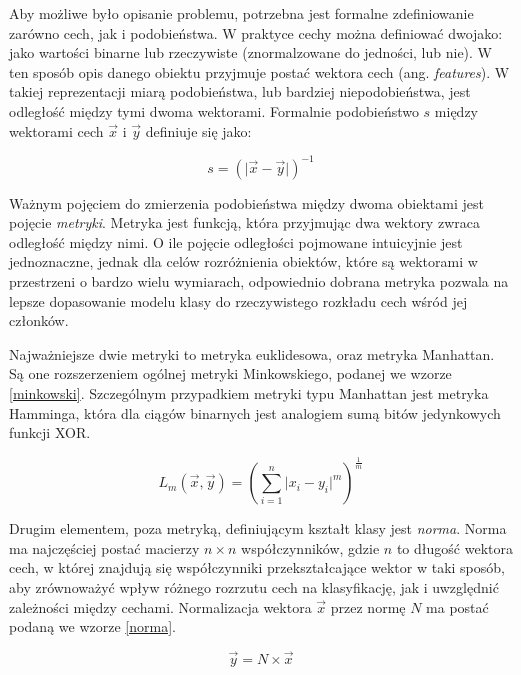 \documentclass[12pt,a4paper,oneside]{report} %
\begin{document}
Aby możliwe było opisanie problemu, potrzebna jest formalne zdefiniowanie zarówno cech, jak i podobieństwa. W praktyce cechy można definiować dwojako: jako wartości binarne lub rzeczywiste (znormalzowane do jedności, lub nie). W ten sposób opis danego obiektu przyjmuje postać wektora cech (ang. \emph{features}). W takiej reprezentacji miarą podobieństwa, lub bardziej niepodobieństwa, jest odległość między tymi dwoma wektorami. Formalnie podobieństwo $s$ między wektorami cech $\vec{x}$ i $\vec{y}$ definiuje się jako:\par

\begin{equation}
s = ( \lvert \vec{x} - \vec{y} \rvert )^{-1}
\end{equation}
\label{similarity}

Ważnym pojęciem do zmierzenia podobieństwa między dwoma obiektami jest pojęcie \emph{metryki}. Metryka jest funkcją, która przyjmując dwa wektory zwraca odległość między nimi. O ile pojęcie odległości pojmowane intuicyjnie jest jednoznaczne, jednak dla celów rozróżnienia obiektów, które są wektorami w przestrzeni o bardzo wielu wymiarach, odpowiednio dobrana metryka pozwala na lepsze dopasowanie modelu klasy do rzeczywistego rozkładu cech wśród jej członków.\par

Najważniejsze dwie metryki to metryka euklidesowa, oraz metryka Manhattan. Są one rozszerzeniem ogólnej metryki Minkowskiego, podanej we wzorze \ref{minkowski}. Szczególnym przypadkiem metryki typu Manhattan jest metryka Hamminga, która dla ciągów binarnych jest analogiem sumą bitów jedynkowych funkcji XOR. \par

\begin{equation}
L_m(\vec{x},\vec{y}) = (\sum\limits_{i=1}^{n} \lvert x_i - y_i \rvert ^m)^{\frac{1}{m}}
\end{equation}
\label{minkowski}

Drugim elementem, poza metryką, definiującym kształt klasy jest \emph{norma}. Norma ma najczęściej postać macierzy $n \times n$ współczynników, gdzie $n$ to długość wektora cech, w której znajdują się współczynniki przekształcające wektor w taki sposób, aby zrównoważyć wpływ różnego rozrzutu cech na klasyfikację, jak i uwzględnić zależności między cechami. Normalizacja wektora $\vec{x}$ przez normę $N$ ma postać podaną we wzorze \ref{norma}. \cite{rutkowski} \par

\begin{equation}
\vec{y} = N \times \vec{x}
\end{equation}
\label{norma}
\end{document}
